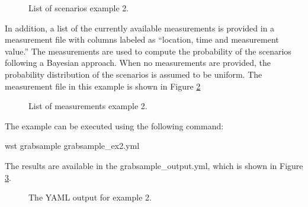 \begin{figure}[!ht]
  \caption{List of scenarios example 2.}
  \label{fig:gs_scenarios}
\end{figure}

In addition, a list of the currently available measurements is provided in a measurement file with columns labeled as ``location, time and measurement value.'' The measurements are used to compute the probability of the scenarios following a Bayesian approach. When no measurements are provided, the probability distribution of the scenarios is assumed to be uniform. The measurement file in this example is shown in Figure \ref{fig:gs_measurements}

\begin{figure}[!ht]
  \caption{List of measurements example 2.}
  \label{fig:gs_measurements}
\end{figure}

The example can be executed using the following command:
\begin{unknownListing}
wst grabsample grabsample_ex2.yml
\end{unknownListing}

The results are available in the {\outputprefix}grabsample\_output.yml, which
is shown in Figure \ref{fig:sampling_ex2_re}.

\begin{figure}[H]
  \caption{The  YAML output for example 2.}
  \label{fig:sampling_ex2_re}
\end{figure}
